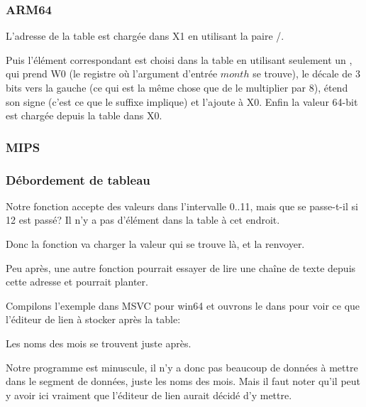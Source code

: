 \subsubsection{ARM64}




L'adresse de la table est chargée dans X1 en utilisant la paire \ADRP/\ADD.

Puis l'élément correspondant est choisi dans la table en utilisant seulement un \LDR,
qui prend W0 (le registre où l'argument d'entrée $month$ se trouve), le décale de
3 bits vers la gauche (ce qui est la même chose que de le multiplier par 8), étend
son signe (c'est ce que le suffixe  implique) et l'ajoute à X0.
Enfin la valeur 64-bit est chargée depuis la table dans X0.

\subsubsection{MIPS}



\subsubsection{Débordement de tableau}

Notre fonction accepte des valeurs dans l'intervalle 0..11, mais que se passe-t-il
si 12 est passé?
Il n'y a pas d'élément dans la table à cet endroit.

Donc la fonction va charger la valeur qui se trouve là, et la renvoyer.

Peu après, une autre fonction pourrait essayer de lire une chaîne de texte depuis
cette adresse et pourrait planter.

Compilons l'exemple dans MSVC pour win64 et ouvrons le dans \IDA pour voir ce que
l'éditeur de lien à stocker après la table:



Les noms des mois se trouvent juste après.

Notre programme est minuscule, il n'y a donc pas beaucoup de données à mettre dans
le segment de données, juste les noms des mois.
Mais il faut noter qu'il peut y avoir ici vraiment  que l'éditeur
de lien aurait décidé d'y mettre.


